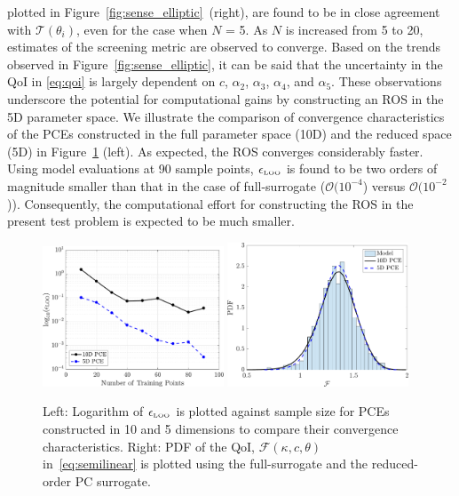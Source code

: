 plotted in Figure~\ref{fig:sense_elliptic}~(right), are found to
be in close agreement with $\mathcal{T}(\theta_i)$, even for the case when $N$ = 5. As $N$
is increased from 5 to 20, estimates of the screening metric are observed to converge.
Based on the trends observed in Figure~\ref{fig:sense_elliptic}, it can be said that
the uncertainty in the QoI in \eqref{eq:qoi} is largely dependent on $c$, 
$\alpha_2$, $\alpha_3$, $\alpha_4$, and $\alpha_5$. These observations underscore the
potential for computational gains by constructing an ROS in the 5D parameter space. We 
illustrate the comparison of convergence characteristics of the PCEs constructed in the
full parameter space (10D) and the reduced space (5D) in Figure~\ref{fig:conv_elliptic} (left). 
As expected, the ROS converges considerably faster. Using model evaluations at 90
sample points, $\epsilon_{\mbox{\tiny{LOO}}}$ is found to be two orders of magnitude
smaller than that in the case of full-surrogate ($\mathcal{O}(10^{-4}$) versus
$\mathcal{O}(10^{-2}$)). 
Consequently, the computational effort for constructing the ROS in the present test problem
is expected to be much smaller. 
%
\begin{figure}[htbp]
 \begin{center}
  \includegraphics[width=0.48\textwidth]{./Figures/err_samples_elliptic}
  \includegraphics[width=0.48\textwidth]{./Figures/pdf_comp_elliptic}
\caption{Left: Logarithm of $\epsilon_{\mbox{\tiny{LOO}}}$ is plotted against sample size for 
PCEs constructed in 10 and 5 dimensions to compare their convergence characteristics. 
Right: PDF of the QoI, $\mathcal{F}(\kappa, c, \theta)$ in~\eqref{eq:semilinear} is
plotted using the full-surrogate and the reduced-order PC surrogate.}
\label{fig:conv_elliptic}
\end{center}
\end{figure}

